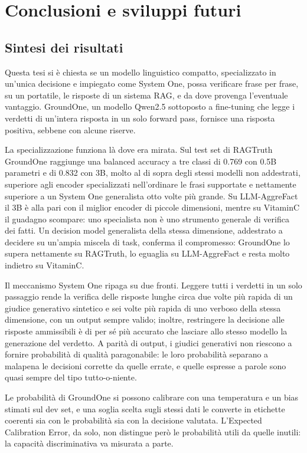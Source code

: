 \chapter{Conclusioni e sviluppi futuri}
\label{sec:conclusion}

\section{Sintesi dei risultati}
\label{sec:concl-summary}

Questa tesi si è chiesta se un modello linguistico compatto, specializzato in un'unica decisione e impiegato come
System One, possa verificare frase per frase, su un portatile, le risposte di un sistema RAG, e da dove provenga
l'eventuale vantaggio. GroundOne, un modello Qwen2.5 sottoposto a fine-tuning che legge i verdetti di un'intera risposta
in un solo forward pass, fornisce una risposta positiva, sebbene con alcune riserve.

La specializzazione funziona là dove era mirata. Sul test set di RAGTruth GroundOne raggiunge una balanced accuracy a tre
classi di 0.769 con 0.5B parametri e di 0.832 con 3B, molto al di sopra degli stessi modelli non addestrati, superiore
agli encoder specializzati nell'ordinare le frasi supportate e nettamente superiore a un System One generalista otto
volte più grande. Su LLM-AggreFact il 3B è alla pari con il miglior encoder di piccole dimensioni, mentre su VitaminC il
guadagno scompare: uno specialista non è uno strumento generale di verifica dei fatti. Un decision model generalista della
stessa dimensione, addestrato a decidere su un'ampia miscela di task, conferma il compromesso: GroundOne lo supera
nettamente su RAGTruth, lo eguaglia su LLM-AggreFact e resta molto indietro su VitaminC.

Il meccanismo System One ripaga su due fronti. Leggere tutti i verdetti in un solo passaggio rende la verifica delle
risposte lunghe circa due volte più rapida di un giudice generativo sintetico e sei volte più rapida di uno verboso della
stessa dimensione, con un output sempre valido; inoltre, restringere la decisione alle risposte ammissibili è di per sé
più accurato che lasciare allo stesso modello la generazione del verdetto. A parità di output, i giudici generativi non
riescono a fornire probabilità di qualità paragonabile: le loro probabilità separano a malapena le decisioni corrette da
quelle errate, e quelle espresse a parole sono quasi sempre del tipo tutto-o-niente.

Le probabilità di GroundOne si possono calibrare con una temperatura e un bias stimati sul dev set, e una soglia scelta
sugli stessi dati le converte in etichette coerenti sia con le probabilità sia con la decisione valutata. L'Expected
Calibration Error, da solo, non distingue però le probabilità utili da quelle inutili: la capacità discriminativa va
misurata a parte.

